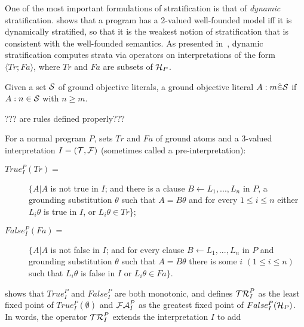 One of the most important formulations of stratification is that of
{\em dynamic} stratification.  \cite{Przy89d} shows that a program has
a 2-valued well-founded model iff it is dynamically stratified, so
that it is the weakest notion of stratification that is consistent
with the well-founded semantics.
%
As presented in~\cite{Przy89d}, dynamic stratification computes strata
via operators on interpretations of the form $\langle Tr;Fa \rangle$,
where $Tr$ and $Fa$ are subsets of $\cH_P$.
%

Given a set $\cS$ of ground objective literals, a ground objective
literal $A:m \hat{\in} \cS$ if $A:n \in \cS$ with $n \geq m$.


??? are rules defined properly???

\begin{definition} \label{def:dyn-ops}
For a normal program $P$, sets $Tr$ and $Fa$ of ground atoms and a
3-valued interpretation $I = (\cT,\cF)$ (sometimes called a pre-interpretation):
\begin{description} \item[$True^P_I(Tr) =$]
    $\{A|A$ is not true in $I$;  and 
                        there is a clause
                        $B \leftarrow L_1,...,L_n$
                in $P$, a grounding substitution $\theta$ such that
                $A = B\theta$ and for every $1 \leq i \leq n$ either
                $L_i\theta$ is true in $I$, or $L_i\theta \in Tr$\};
  \item[$False^P_I(Fa) =$] 
$\{A|A$ is not false in $I$; and for every
    clause $B \leftarrow L_1,...,L_n$ in $P$ and grounding substitution
    $\theta$ such that $A = B\theta$ there is some $i$ $(1 \leq i \leq
    n)$ such that $L_i\theta$ is false in $I$ or $L_i\theta \in Fa\}$.
\end{description}
\end{definition}
%
\cite{Przy89d} shows that $True^P_I$ and $False^P_I$ are both
monotonic, and defines $\mathcal{TR}^P_I$ as the least fixed point of $True^P_I(\emptyset)$
and $\calfalse^P_I$ as the greatest fixed point of
$False^P_I(\cH_P)$.
%
In words, the operator $\mathcal{TR}^P_I$ extends the interpretation $I$ to add

